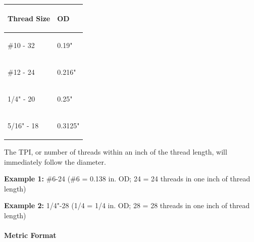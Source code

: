 \documentclass[english,]{article}
\let\oldparagraph\paragraph
\renewcommand{\paragraph}[1]{\oldparagraph{#1}\mbox{}}
\begin{document}
\begin{longtable}[]{@{}ll@{}}
\toprule
\begin{minipage}[b]{0.47\columnwidth}\raggedright
\hypertarget{ip8vlo}{}
Thread Size\strut
\end{minipage} & \begin{minipage}[b]{0.47\columnwidth}\raggedright
\hypertarget{ilg6c1}{}
OD\strut
\end{minipage}\tabularnewline
\midrule
\endhead
\begin{minipage}[t]{0.47\columnwidth}\raggedright
\hypertarget{ij13wo}{}
\#10 - 32\strut
\end{minipage} & \begin{minipage}[t]{0.47\columnwidth}\raggedright
\hypertarget{imhx99}{}
0.19"\strut
\end{minipage}\tabularnewline
\begin{minipage}[t]{0.47\columnwidth}\raggedright
\hypertarget{iofufv}{}
\#12 - 24\strut
\end{minipage} & \begin{minipage}[t]{0.47\columnwidth}\raggedright
\hypertarget{i5dvs2}{}
0.216"\strut
\end{minipage}\tabularnewline
\begin{minipage}[t]{0.47\columnwidth}\raggedright
\hypertarget{iwitbx}{}
1/4" - 20\strut
\end{minipage} & \begin{minipage}[t]{0.47\columnwidth}\raggedright
\hypertarget{i2rpr7}{}
0.25"\strut
\end{minipage}\tabularnewline
\begin{minipage}[t]{0.47\columnwidth}\raggedright
\hypertarget{icppsh}{}
5/16" - 18\strut
\end{minipage} & \begin{minipage}[t]{0.47\columnwidth}\raggedright
\hypertarget{ie9zwk}{}
0.3125"\strut
\end{minipage}\tabularnewline
\bottomrule
\end{longtable}

\hypertarget{ii5xkl}{}
The TPI, or number of threads within an inch of the thread length, will
immediately follow the diameter.

\hypertarget{iujivc}{}
\textbf{Example 1:} \#6-24 (\#6 = 0.138 in. OD; 24 = 24 threads in one
inch of thread length)

\textbf{Example 2:} 1/4"-28 (1/4 = 1/4 in. OD; 28 = 28 threads in one
inch of thread length)

\hypertarget{i7byi7f}{%
\paragraph{Metric Format}\label{i7byi7f}}
\end{document}
